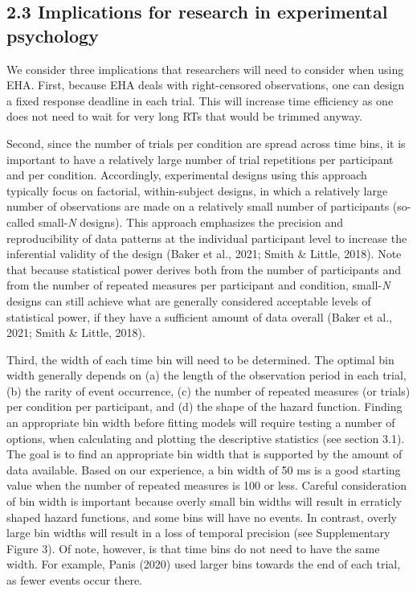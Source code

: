 \documentclass[
  english,
  man, donotrepeattitle,floatsintext]{apa6}
\begin{document}
\subsection{2.3 Implications for research in experimental psychology}\label{implications-for-research-in-experimental-psychology}

We consider three implications that researchers will need to consider when using EHA. First, because EHA deals with right-censored observations, one can design a fixed response deadline in each trial. This will increase time efficiency as one does not need to wait for very long RTs that would be trimmed anyway.

Second, since the number of trials per condition are spread across time bins, it is important to have a relatively large number of trial repetitions per participant and per condition. Accordingly, experimental designs using this approach typically focus on factorial, within-subject designs, in which a relatively large number of observations are made on a relatively small number of participants (so-called small-\emph{N} designs). This approach emphasizes the precision and reproducibility of data patterns at the individual participant level to increase the inferential validity of the design (Baker et al., 2021; Smith \& Little, 2018). Note that because statistical power derives both from the number of participants and from the number of repeated measures per participant and condition, small-\emph{N} designs can still achieve what are generally considered acceptable levels of statistical power, if they have a sufficient amount of data overall (Baker et al., 2021; Smith \& Little, 2018).

Third, the width of each time bin will need to be determined. The optimal bin width generally depends on (a) the length of the observation period in each trial, (b) the rarity of event occurrence, (c) the number of repeated measures (or trials) per condition per participant, and (d) the shape of the hazard function. Finding an appropriate bin width before fitting models will require testing a number of options, when calculating and plotting the descriptive statistics (see section 3.1). The goal is to find an appropriate bin width that is supported by the amount of data available. Based on our experience, a bin width of 50 ms is a good starting value when the number of repeated measures is 100 or less. Careful consideration of bin width is important because overly small bin widths will result in erraticly shaped hazard functions, and some bins will have no events. In contrast, overly large bin widths will result in a loss of temporal precision (see Supplementary Figure 3). Of note, however, is that time bins do not need to have the same width. For example, Panis (2020) used larger bins towards the end of each trial, as fewer events occur there.
\end{document}
